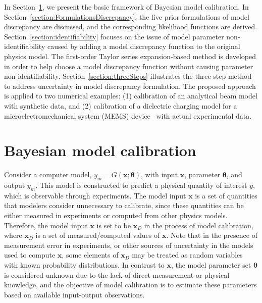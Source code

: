 \documentclass[preprint,review,12pt,3p]{elsarticle}
\begin{document}
In Section~\ref{section:BayesianCAL}, we present the basic framework of Bayesian model calibration. In Section~\ref{section:FormulationsDiscrepancy}, the five prior formulations of model discrepancy are discussed, and the corresponding likelihood functions are derived. Section~\ref{section:identifiability} focuses on the issue of model parameter non-identifiability caused by adding a model discrepancy function to the original physics model. The first-order Taylor series expansion-based method is developed in order to help choose a model discrepancy function without causing parameter non-identifiability.  Section~\ref{section:threeSteps} illustrates the three-step method to address uncertainty in model discrepancy formulation. The proposed approach is applied to two numerical examples: (1) calibration of an analytical beam model with synthetic data, and (2) calibration of a dielectric charging model for a microelectromechanical system (MEMS) device~\citep{Palit2012} with actual experimental data.

\section{Bayesian model calibration}\label{section:BayesianCAL}

Consider a computer model, $y_m = G(\boldsymbol{x};\boldsymbol{\theta})$, with input $\boldsymbol{x}$, parameter $\boldsymbol{\theta}$, and output $y_m$. This model is constructed to predict a physical quantity of interest $y$, which is observable through experiments. The model input $\boldsymbol{x}$ is a set of quantities that modelers consider unnecessary to calibrate, since these quantities can be either measured in experiments or computed from other physics models. Therefore, the model input $\boldsymbol{x}$ is set to be $\boldsymbol{x}_D$ in the process of model calibration, where $\boldsymbol{x}_D$ is a set of measured/computed values of $\boldsymbol{x}$. Note that in the presence of measurement error in experiments, or other sources of uncertainty in the models used to compute $\boldsymbol{x}$, some elements of $\boldsymbol{x}_D$ may be treated as random variables with known probability distributions. In contrast to $\boldsymbol{x}$, the model parameter set $\boldsymbol{\theta}$ is considered unknown due to the lack of direct measurement or physical knowledge, and the objective of model calibration is to estimate these parameters based on available input-output observations.
\end{document}
